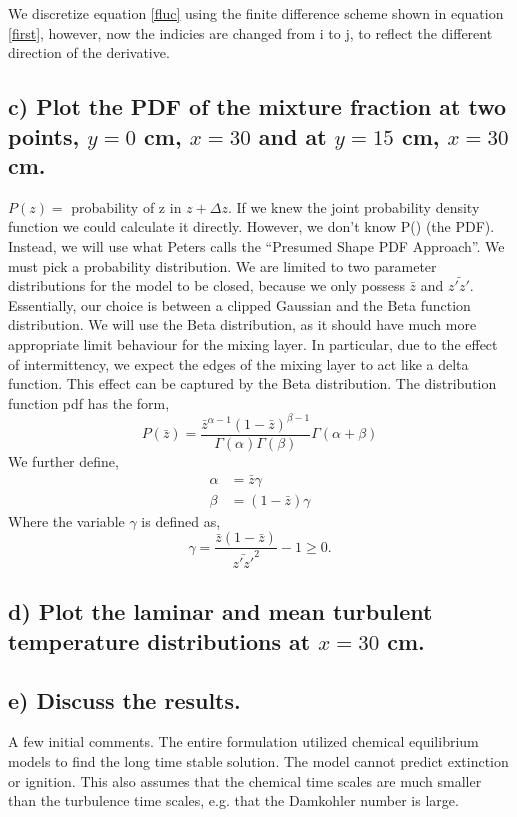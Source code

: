 \documentclass{article}
\begin{document}
We discretize equation \ref{fluc} using the finite difference scheme shown in equation \ref{first}, however, 
now the indicies are changed from i to j, to reflect the different direction of the derivative.
%
%
%
%
\subsection*{c) Plot the PDF of the mixture fraction at two points, $y=0$ cm,
$x=30$ and at $y=15$ cm, $x=30$ cm.}

$P(z) =$ probability of z in $z+\Delta z$. If we knew the joint probability density function
we could calculate it directly. However, we don't know P() (the PDF). Instead, we will use 
what Peters calls the ``Presumed Shape PDF Approach''. We must pick a probability distribution. 
We are limited to two parameter distributions for the model to be closed, because we only possess 
$\bar z$ and $\bar{z'z'}$. Essentially, our choice is between a clipped Gaussian and the Beta 
function distribution. We will use the Beta distribution, as it should have much more appropriate 
limit behaviour for the mixing layer. In particular, due to the effect of intermittency, we expect the 
edges of the mixing layer to act like a delta function. This effect can be captured by the Beta distribution. 
The distribution function pdf has the form, 
\begin{equation}
P(\bar z) = \frac{\bar z^{\alpha-1}(1-\bar z)^{\beta-1}}{\Gamma(\alpha)\Gamma(\beta)}\Gamma(\alpha + \beta)
\end{equation}
We further define,
\begin{align}
\alpha &= \bar z \gamma \\
\beta  &= (1-\bar z) \gamma
\end{align}
Where the variable $\gamma$ is defined as, 
\begin{equation}
  \gamma = \frac{\bar z (1-\bar z)}{\bar{z'z'}^2} -1 \geq 0.
\end{equation}
%
%
%
%
\subsection*{d) Plot the laminar and mean turbulent temperature
distributions at $x=30$ cm.}

\subsection*{e) Discuss the results.}

A few initial comments. The entire formulation utilized chemical equilibrium models 
to find the long time stable solution. The model cannot predict extinction or ignition. 
This also assumes that the chemical time scales are much smaller than the turbulence 
time scales, e.g. that the Damkohler number is large. 
\end{document}
